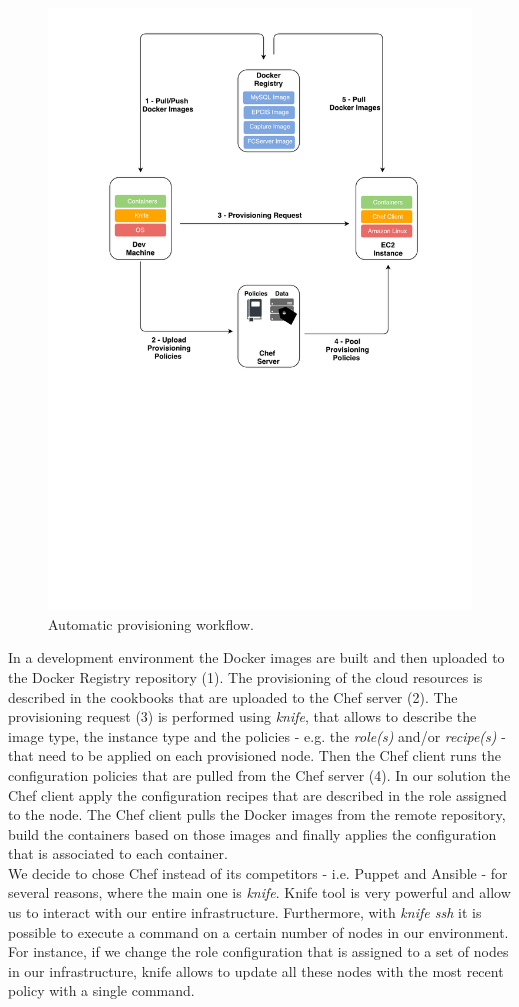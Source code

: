 \begin{figure}[ht!]
  \centering
  \includegraphics[width=.5\textwidth]{./figures/c4t-tech-architecture}
  \caption[Automatic provisioning workflow.]{Automatic provisioning workflow.}
  \label{fig:provisioning_tech_architecture}
\end{figure}

In a development environment the Docker images are built and then uploaded to the Docker Registry
repository (1). The provisioning of the cloud resources is described in the cookbooks that are uploaded
to the Chef server (2). The provisioning request (3) is performed using \textit{knife}, that allows to
describe the image type, the instance type and the policies - e.g. the \textit{role(s)} and/or \textit{recipe(s)} -
that need to be applied on each provisioned node. Then the Chef client runs the configuration policies
that are pulled from the Chef server (4). In our solution the Chef client apply the configuration recipes
that are described in the role assigned to the node. The Chef client pulls the Docker images from the
remote repository, build the containers based on those images and finally applies the configuration
that is associated to each container.\\

We decide to chose Chef instead of its competitors - i.e. Puppet and Ansible - for several
reasons, where the main one is \textit{knife}. Knife tool is very powerful and allow us to
interact with our entire infrastructure. Furthermore, with \textit{knife ssh} it is possible
to execute a command on a certain number of nodes in our environment. For instance, if we change
the role configuration that is assigned to a set of nodes in our infrastructure, knife allows to
update all these nodes with the most recent policy with a single command.
